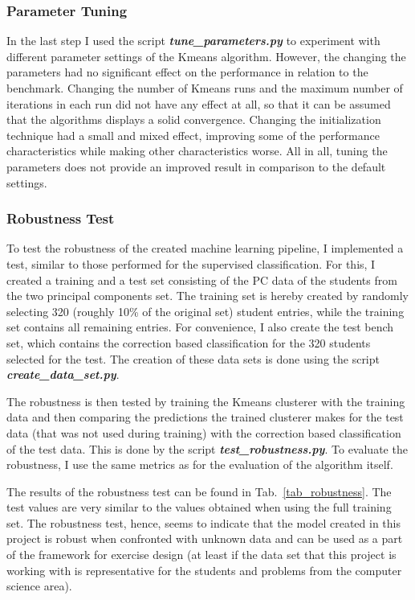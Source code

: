 \subsubsection{Parameter Tuning}
In the last step I used the script \textbf{\emph{tune\_parameters.py}} to experiment with different parameter settings of the Kmeans algorithm. However, the changing the parameters had no significant effect on the performance in relation to the benchmark. Changing the number of Kmeans runs and the maximum number of iterations in each run did not have any effect at all, so that it can be assumed that the algorithms displays a solid convergence. Changing the initialization technique had a small and mixed effect, improving some of the performance characteristics while making other characteristics worse. All in all, tuning the parameters does not provide an improved result in comparison to the default settings. 

\subsubsection{Robustness Test}
To test the robustness of the created machine learning pipeline, I implemented a test, similar to those performed for the supervised classification. For this, I created a training and a test set consisting of the PC data of the students from the two principal components set. The training set is hereby created by randomly selecting 320 (roughly 10\% of the original set) student entries, while the training set contains all remaining entries. For convenience, I also create the test bench set, which contains the correction based classification for the 320 students selected for the test. The creation of these data sets is done using the script \textbf{\emph{create\_data\_set.py}}.

The robustness is then tested by training the Kmeans clusterer with the training data and then comparing the predictions the trained clusterer makes for the test data (that was not used during training) with the correction based classification of the test data. This is done by the script \textbf{\emph{test\_robustness.py}}. To evaluate the robustness, I use the same metrics as for the evaluation of the algorithm itself.

The results of the robustness test can be found in Tab.~\ref{tab_robustness}. The test values are very similar to the values obtained when using the full training set. The robustness test, hence, seems to indicate that the model created in this project is robust when confronted with unknown data and can be used as a part of the framework for exercise design (at least if the data set that this project is working with is representative for the students and problems from the computer science area).


